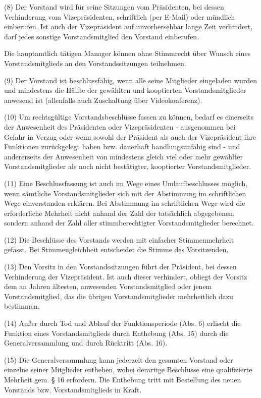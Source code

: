 \documentclass[11pt,a4paper]{article}
\begin{document}
(8)
Der Vorstand wird für seine Sitzungen vom Präsidenten, bei dessen Verhinderung vom Vizepräsidenten, schriftlich (per E-Mail) oder mündlich einberufen.
Ist auch der Vizepräsident auf unvorhersehbar lange Zeit verhindert, darf jedes sonstige Vorstandsmitglied den Vorstand einberufen.

Die hauptamtlich tätigen Manager können ohne Stimmrecht über Wunsch eines Vorstandsmitglieds an den Vorstandssitzungen teilnehmen.

(9)
Der Vorstand ist beschlussfähig, wenn alle seine Mitglieder eingeladen wurden und mindestens die Hälfte der gewählten und kooptierten Vorstandsmitglieder anwesend ist (allenfalls auch Zuschaltung über Videokonferenz).

(10)
Um rechtsgültige Vorstandsbeschlüsse fassen zu können, bedarf es einerseits der Anwesenheit des Präsidenten oder Vizepräsidenten - ausgenommen bei Gefahr in Verzug oder wenn sowohl der Präsident als auch der Vizepräsident ihre Funktionen zurückgelegt haben bzw. dauerhaft handlungsunfähig sind - und andererseits der Anwesenheit von mindestens gleich viel oder mehr gewählter Vorstandsmitglieder als noch nicht bestätigter, kooptierter Vorstandsmitglieder.

(11)
Eine Beschlussfassung ist auch im Wege eines Umlaufbeschlusses möglich, wenn sämtliche Vorstandsmitglieder sich mit der Abstimmung im schriftlichen Wege einverstanden erklären.
Bei Abstimmung im schriftlichen Wege wird die erforderliche Mehrheit nicht anhand der Zahl der tatsächlich abgegebenen, sondern anhand der Zahl aller stimmberechtigter Vorstandsmitglieder berechnet.

(12)
Die Beschlüsse des Vorstands werden mit einfacher Stimmenmehrheit gefasst.
Bei Stimmengleichheit entscheidet die Stimme des Vorsitzenden.

(13)
Den Vorsitz in den Vorstandssitzungen führt der Präsident, bei dessen Verhinderung der Vizepräsident.
Ist auch dieser verhindert, obliegt der Vorsitz dem an Jahren ältesten, anwesenden Vorstandsmitglied oder jenem Vorstandsmitglied, das die übrigen Vorstandsmitglieder mehrheitlich dazu bestimmen.

(14)
Außer durch Tod und Ablauf der Funktionsperiode (Abs. 6) erlischt die Funktion eines Vorstandsmitglieds durch Enthebung (Abs. 15) durch die Generalversammlung und durch Rücktritt (Abs. 16).

(15)
Die Generalversammlung kann jederzeit den gesamten Vorstand oder einzelne seiner Mitglieder entheben, wobei derartige Beschlüsse eine qualifizierte Mehrheit gem. § 16 erfordern.
Die Enthebung tritt mit Bestellung des neuen Vorstands bzw. Vorstandsmitglieds in Kraft.
\end{document}
